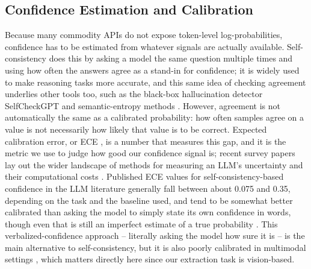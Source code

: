 \documentclass[conference]{IEEEtran}
\begin{document}
\subsection{Confidence Estimation and Calibration}
Because many commodity APIs do not expose token-level log-probabilities, confidence has to be estimated from whatever signals are actually available. Self-consistency \cite{b5} does this by asking a model the same question multiple times and using how often the answers agree as a stand-in for confidence; it is widely used to make reasoning tasks more accurate, and this same idea of checking agreement underlies other tools too, such as the black-box hallucination detector SelfCheckGPT \cite{b12} and semantic-entropy methods \cite{b13}. However, agreement is not automatically the same as a calibrated probability: how often samples agree on a value is not necessarily how likely that value is to be correct. Expected calibration error, or ECE \cite{b6}, is a number that measures this gap, and it is the metric we use to judge how good our confidence signal is; recent survey papers lay out the wider landscape of methods for measuring an LLM's uncertainty and their computational costs \cite{b18,b19}. Published ECE values for self-consistency-based confidence in the LLM literature generally fall between about 0.075 and 0.35, depending on the task and the baseline used, and tend to be somewhat better calibrated than asking the model to simply state its own confidence in words, though even that is still an imperfect estimate of a true probability \cite{b11}. This verbalized-confidence approach -- literally asking the model how sure it is \cite{b14,b15} -- is the main alternative to self-consistency, but it is also poorly calibrated in multimodal settings \cite{b20,b21}, which matters directly here since our extraction task is vision-based.
\end{document}
